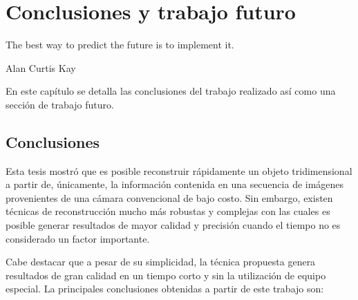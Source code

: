 \chapter{Conclusiones y trabajo futuro}
\label{chap:conclusiones}
\epigraph{The best way to predict the future is to implement it.}{Alan Curtis Kay}

En este cap\'{i}tulo se detalla las conclusiones del trabajo realizado as\'{i} como una secci\'{o}n de trabajo futuro.

\section{Conclusiones}
Esta tesis mostr\'{o} que es posible reconstruir r\'{a}pidamente un objeto tridimensional a partir de, \'{u}nicamente, la informaci\'{o}n contenida en una secuencia de im\'{a}genes provenientes de una c\'{a}mara convencional de bajo costo. Sin embargo, existen t\'{e}cnicas de reconstrucci\'{o}n mucho m\'{a}s robustas y complejas con las cuales es posible generar resultados de mayor calidad y precisi\'{o}n cuando el tiempo no es considerado un factor importante. 

Cabe destacar que a pesar de su simplicidad, la técnica propuesta genera resultados de gran calidad en un tiempo corto y sin la utilización de equipo especial. La principales conclusiones obtenidas a partir de este trabajo son:

